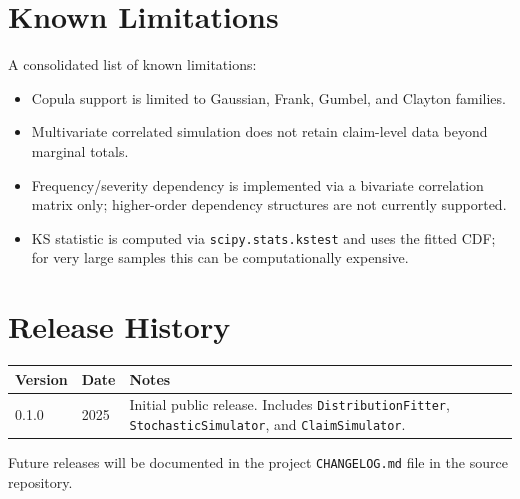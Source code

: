 \section{Known Limitations}
\label{app:limitations}

A consolidated list of known limitations:

\begin{itemize}[leftmargin=*]
    \item Copula support is limited to Gaussian, Frank, Gumbel, and
          Clayton families.
    \item Multivariate correlated simulation does not retain
          claim-level data beyond marginal totals.
    \item Frequency/severity dependency is implemented via a bivariate
          correlation matrix only; higher-order dependency structures
          are not currently supported.
    \item KS statistic is computed via \texttt{scipy.stats.kstest} and
          uses the fitted CDF; for very large samples this can be
          computationally expensive.
\end{itemize}

\section{Release History}
\label{app:release_history}

\begin{longtable}{p{}p{}p{}}
\toprule
\textbf{Version} & \textbf{Date} & \textbf{Notes} \\
\midrule
\endhead
0.1.0 & 2025 & Initial public release. Includes
                \texttt{DistributionFitter}, \texttt{StochasticSimulator},
                and \texttt{ClaimSimulator}. \\
\bottomrule
\end{longtable}

Future releases will be documented in the project \texttt{CHANGELOG.md}
file in the source repository.